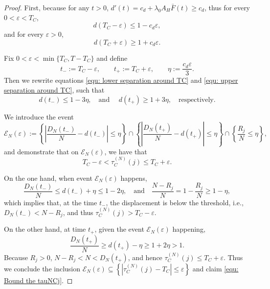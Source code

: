 \documentclass{article}
\theoremstyle{definition}
\begin{document}
\begin{proof}
    First, because for any $t>0$, $d'(t) = c_d + \lambda_0 A_H \bar F(t) \geq c_d$, thus for every $0<\varepsilon<T_C$,
    \begin{equation}
    \label{equ: lower separation around TC}
        d(T_C-\varepsilon)\leq1-c_d\varepsilon,
    \end{equation}
    and for every $\varepsilon>0$,
    \begin{equation}
    \label{equ: upper separation around TC}
        d(T_C+\varepsilon)\geq1+c_d\varepsilon.
    \end{equation}

    Fix $0<\varepsilon<\min\{T_C,T-T_C\}$ and define
    \begin{equation*}
        t_-:=T_C-\varepsilon, \qquad t_+:=T_C+\varepsilon, \qquad \eta:=\frac{c_d\varepsilon}{3}.
    \end{equation*}
    Then we rewrite equations \eqref{equ: lower separation around TC} and \eqref{equ: upper separation around TC}, such that 
    \begin{equation*}
    d(t_-)\leq1-3\eta, \quad \text{and }\quad d(t_+)\geq1+3\eta, \quad \text{respectively.}
    \end{equation*}
    
    We introduce the event
    \begin{equation*}
        \mathcal E_N(\varepsilon) := \left\{\left|\frac{D_N(t_-)}{N}-d(t_-)\right |\leq\eta\right\}\cap\left\{\left|\frac{D_N(t_+)}{N}-d(t_+)\right|\leq\eta\right\}\cap\left\{\frac{R_j}{N}\leq\eta\right\},
    \end{equation*}
    and demonstrate that on $\mathcal E_N(\varepsilon)$, we have that 
    \begin{equation}
        \label{equ: Bound the tauNCj}
        T_C-\varepsilon< \tau_C^{(N)}(j)\leq T_C+\varepsilon.
    \end{equation}
    
    On the one hand, when event $\mathcal E_N(\varepsilon)$ happens,
    \begin{equation*}
        \frac{D_N(t_-)}{N}\leq d(t_-)+\eta\leq1-2\eta, \quad \text{and} \quad  \frac{N-R_j}{N}=1-\frac{R_j}{N}\geq1-\eta,
    \end{equation*}
    which implies that, at the time $t_-$, the displacement is below the threshold, i.e., $D_N(t_-)<N-R_j$, and thus $\tau_C^{(N)}(j)>T_C-\varepsilon.$

    On the other hand, at time $t_+$, given the event $\mathcal E_N(\varepsilon)$ happening, 
    \begin{equation*}
        \frac{D_N(t_+)}{N}\geq d(t_+)-\eta\geq1+2\eta>1.
    \end{equation*}
    Because $R_j > 0$, $N-R_j< N<D_N(t_+)$, and hence $\tau_C^{(N)}(j)\leq T_C+\varepsilon.$ Thus we conclude the inclusion $\mathcal E_N(\varepsilon)\subseteq\left\{\left|\tau_C^{(N)}(j)-T_C\right|\leq\varepsilon\right\}$ and claim \eqref{equ: Bound the tauNCj}.


\end{proof}
\end{document}
